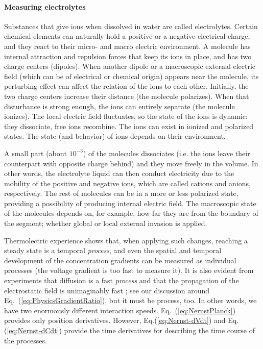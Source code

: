 \paragraph{Measuring electrolytes\label{sec:Physics-ElectrolytesConductivity}}	
Substances that give ions when dissolved in water are called electrolytes.  Certain chemical elements can naturally hold a positive or a negative electrical charge, and they react to their micro- and macro electric environment. A molecule has internal attraction and repulsion forces that keep its ions in place, and has two charge centers (dipoles). When another dipole or a macroscopic external electric field (which can be of electrical or chemical origin) appears near the molecule, its perturbing effect can affect the relation of the ions to each other. Initially, the two charge centers increase their distance (the molecule polarizes). When that disturbance is strong enough, the ions can entirely separate (the molecule ionizes).
The local electric field fluctuates, so the state of the ions is dynamic: they dissociate, free ions recombine.
The ions can exist in ionized and polarized states.
The state (and behavior) of ions depends on their environment.

A small part (about $10^{-3}$) of the molecules dissociates (i.e. the ions leave their counterpart with opposite charge behind) and they move freely in the volume. In other words, the electrolyte liquid can then conduct electricity due to the mobility of the positive and negative ions, which are called cations and anions, respectively. 
The rest of molecules can be in a more or less polarized state, providing a possibility of producing internal electric field.
The macroscopic state of the molecules depends on,
for example, how far they are from the boundary of the segment; whether global or local external invasion is applied. 

Thermolectric experience shows that, when applying such changes, reaching a steady state
is a temporal \emph{process}, and even the spatial and temporal development
of the concentration gradients can be measured as individual
processes (the voltage gradient is too fast to measure it). It is also evident from experiments that diffusion is a
fast \emph{process} and that the propagation of the electrostatic
field is unimaginably fast ; see our discussion around Eq.~(\ref{eq:PhysicsGradientRatio}), but it must be process, too. In other words,
we have two enormously different interaction speeds. Eq.~(\ref{eq:NernstPlanck})
provides only position derivatives. 
However, Eq.(\ref{eq:Nernst-dVdt}) and Eq.(\ref{eq:Nernst-dCdt}) provide the time derivatives for describing 
the time course of the processes.


